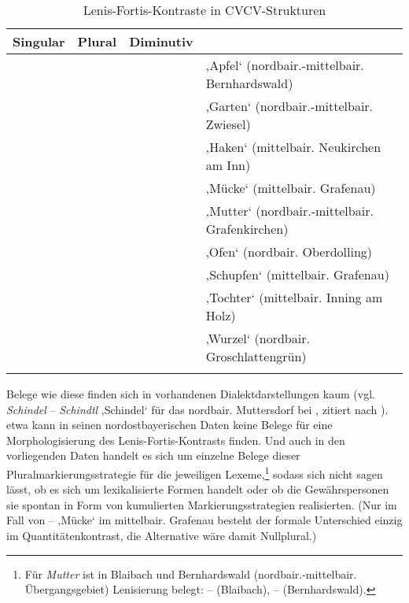 \begin{table}
\begin{tabularx}{\textwidth}{lllQ}
\lsptoprule
{Singular} & {Plural} & {Diminutiv} & \\
\midrule
  &  &  & ‚Apfel‘ (nordbair.-mittelbair. Bernhardswald)\\
 \tablevspace
  &  &  & ‚Garten‘ (nordbair.-mittelbair. Zwiesel)\\
 \tablevspace
  &  &  & ‚Haken‘ (mittelbair. Neukirchen am Inn) \\
 \tablevspace
  &  &  & ‚Mücke‘ (mittelbair. Grafenau)\\
 \tablevspace
  &  &  & ‚Mutter‘ (nordbair.-mittelbair. Grafenkirchen)\\
 \tablevspace
  &  &  & ‚Ofen‘ (nordbair. Oberdolling)\\
 \tablevspace
  &  &  & ‚Schupfen‘ (mittelbair. Grafenau)\\
 \tablevspace
  &  &  & ‚Tochter‘ (mittelbair. Inning am Holz)\\
 \tablevspace
  &  &  & ‚Wurzel‘ (nordbair. Groschlattengrün)\\
\lspbottomrule
\end{tabularx}
\caption{Lenis-Fortis-Kontraste in CVCV-Strukturen}
\label{tab:29}
\end{table}

Belege wie diese finden sich in vorhandenen Dialektdarstellungen kaum (vgl. \textit{Schindel} -- \textit{Schindtl} ‚Schindel‘ für das nordbair. Muttersdorf bei \citealt{Micko1933}, zitiert nach \citealt[123]{Rowley1997}). \citet[123]{Rowley1997} etwa kann in seinen nordostbayerischen Daten keine Belege für eine Morphologisierung des Lenis-Fortis-Kontrasts finden. Und auch in den vorliegenden Daten handelt es sich um einzelne Belege dieser Pluralmarkierungsstrategie für die jeweiligen Lexeme,\footnote{Für \textit{Mutter} ist in Blaibach und Bernhardswald (nordbair.-mittelbair. Übergangsgebiet) Lenisierung belegt:  --  (Blaibach),  --  (Bernhardswald).} sodass sich nicht sagen lässt, ob es sich um lexikalisierte Formen handelt oder ob die Gewährspersonen sie spontan in Form von kumulierten Markierungsstrategien realisierten. (Nur im Fall von  --  ‚Mücke‘ im mittelbair. Grafenau besteht der formale Unterschied einzig im Quantitätenkontrast, die Alternative wäre damit Nullplural.)

